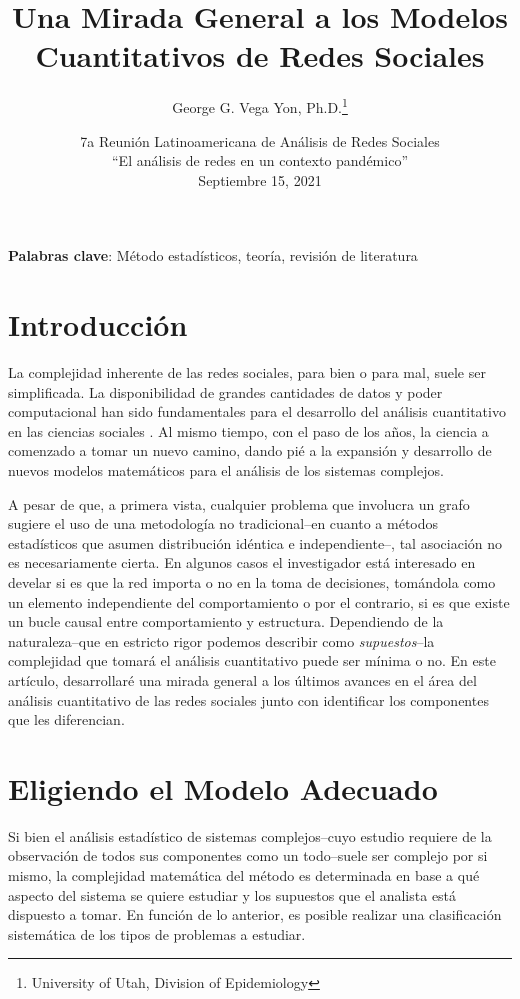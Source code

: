 \documentclass[11pt]{article}
\title{Una Mirada General a los Modelos Cuantitativos de Redes Sociales}
\author{George G. Vega Yon, Ph.D.\footnote{University of Utah, Division of Epidemiology}}
\date{7a Reunión Latinoamericana de Análisis de Redes Sociales\\“El análisis de redes en un contexto pandémico”\\Septiembre 15, 2021}
\begin{document}
\maketitle
	
\noindent\textbf{Palabras clave}: Método estadísticos, teoría, revisión de literatura

\section{Introducción}

La complejidad inherente de las redes sociales, para bien o para mal, suele ser simplificada. La disponibilidad de grandes cantidades de datos y poder computacional han sido fundamentales para el desarrollo del análisis cuantitativo en las ciencias sociales \parencite{Hofman2021,Lazer2020}. Al mismo tiempo, con el paso de los años, la ciencia a comenzado a tomar un nuevo camino, dando pié a la expansión y desarrollo de nuevos modelos matemáticos para el análisis de los sistemas complejos.

A pesar de que, a primera vista, cualquier problema que involucra un grafo sugiere el uso de una metodología no tradicional--en cuanto a métodos estadísticos que asumen distribución idéntica e independiente--, tal asociación no es necesariamente cierta. En algunos casos el investigador está interesado en develar si es que la red importa o no en la toma de decisiones, tomándola como un elemento independiente del comportamiento o por el contrario, si es que existe un bucle causal entre comportamiento y estructura. Dependiendo de la naturaleza--que en estricto rigor podemos describir como \textit{supuestos}--la complejidad que tomará el análisis cuantitativo puede ser mínima o no. En este artículo, desarrollaré una mirada general a los últimos avances en el área del análisis cuantitativo de las redes sociales junto con identificar los componentes que les diferencian. 

\section{Eligiendo el Modelo Adecuado}

Si bien el análisis estadístico de sistemas complejos--cuyo estudio requiere de la observación de todos sus componentes como un todo--suele ser complejo por si mismo, la complejidad matemática del método es determinada en base a qué aspecto del sistema se quiere estudiar y los supuestos que el analista está dispuesto a tomar. En función de lo anterior, es posible realizar una clasificación sistemática de los tipos de problemas a estudiar.
\end{document}

